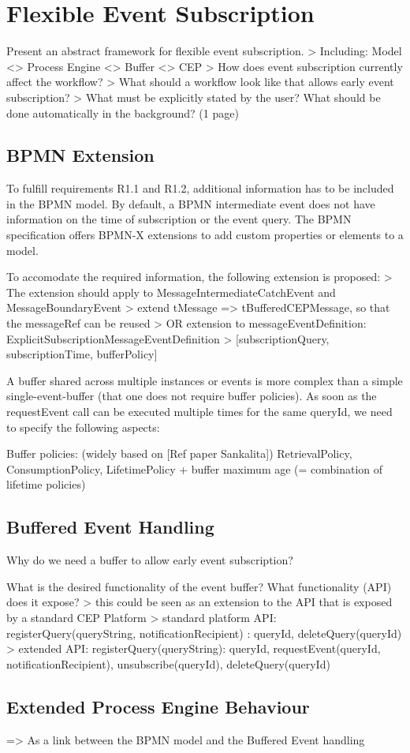 \chapter{Flexible Event Subscription}\label{ch:flexibleeventsubscription}

Present an abstract framework for flexible event subscription.
> Including: Model <> Process Engine <> Buffer <> CEP
> How does event subscription currently affect the workflow?
> What should a workflow look like that allows early event subscription?
> What must be explicitly stated by the user? What should be done automatically in the background?
(1 page)

\section{BPMN Extension}
To fulfill requirements R1.1 and R1.2, additional information has to be included in the BPMN model. By default, a BPMN intermediate event does not have information on the time of subscription or the event query. 
The BPMN specification offers BPMN-X extensions to add custom properties or elements to a model.

To accomodate the required information, the following extension is proposed:
> The extension should apply to MessageIntermediateCatchEvent and MessageBoundaryEvent
> extend tMessage => tBufferedCEPMessage, so that the messageRef can be reused
> OR extension to messageEventDefinition: ExplicitSubscriptionMessageEventDefinition
> [subscriptionQuery, subscriptionTime, bufferPolicy]

A buffer shared across multiple instances or events is more complex than a simple single-event-buffer (that one does not require buffer policies). As soon as the requestEvent call can be executed multiple times for the same queryId, we need to specify the following aspects:

Buffer policies:
(widely based on [Ref paper Sankalita]) RetrievalPolicy, ConsumptionPolicy, LifetimePolicy
+ buffer maximum age (= combination of lifetime policies)

\section{Buffered Event Handling}
Why do we need a buffer to allow early event subscription?

What is the desired functionality of the event buffer? What functionality (API) does it expose?
> this could be seen as an extension to the API that is exposed by a standard CEP Platform
> standard platform API: registerQuery(queryString, notificationRecipient) : queryId, deleteQuery(queryId)
> extended API: registerQuery(queryString): queryId, requestEvent(queryId, notificationRecipient), unsubscribe(queryId), deleteQuery(queryId)




\section{Extended Process Engine Behaviour}
=> As a link between the BPMN model and the Buffered Event handling